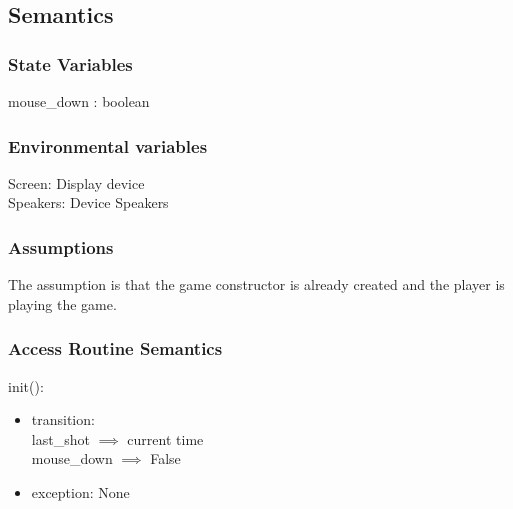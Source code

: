 \documentclass[12pt, titlepage]{article}
\begin{document}
\subsection {Semantics}

\subsubsection {State Variables}
mouse\_down : boolean\\

\subsubsection {Environmental variables}
Screen: Display device\\
Speakers: Device Speakers

\subsubsection {Assumptions}
The assumption is that the game constructor is already created and the player is playing the game.

\subsubsection {Access Routine Semantics}

\noindent init():
\begin{itemize}
\item transition:\\
last\_shot $\implies$ current time\\
mouse\_down $\implies$ False\\
\item exception: None
\end{itemize}
\end{document}
